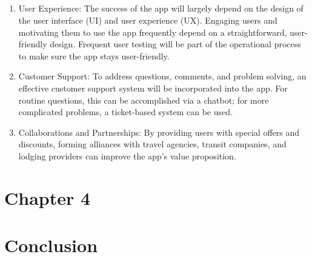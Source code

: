\documentclass[12pt,a4paper]{report}
\begin{document}
\section{}
\begin{enumerate}

    \item User Experience: The success of the app will largely depend on the design of the user interface (UI) and user experience (UX). Engaging users and motivating them to use the app frequently depend on a straightforward, user-friendly design. Frequent user testing will be part of the operational process to make sure the app stays user-friendly.

    \item Customer Support: To address questions, comments, and problem solving, an effective customer support system will be incorporated into the app. For routine questions, this can be accomplished via a chatbot; for more complicated problems, a ticket-based system can be used.

    \item Collaborations and Partnerships: By providing users with special offers and discounts, forming alliances with travel agencies, transit companies, and lodging providers can improve the app's value proposition.
 
\end{enumerate}
\chapter{Chapter 4}

\chapter{Conclusion}

\raggedright
	
\end{document}
